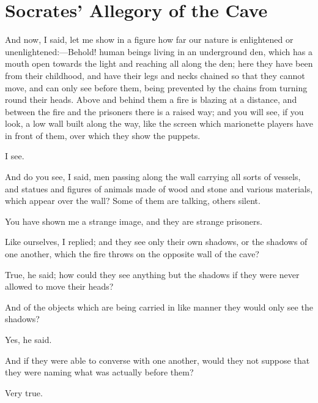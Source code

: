 
\author{Plato}
\chapter[Socrates' Allegory of the Cave]{Socrates' Allegory of the Cave}


And now, I said, let me show in a figure how far our nature is
enlightened or un\-en\-light\-ened:---Behold! human beings living in
an underground den, which has a mouth open towards the light and
reaching all along the den; here they have been from their childhood,
and have their legs and necks chained so that they cannot move, and
can only see before them, being prevented by the chains from turning
round their heads. Above and behind them a fire is blazing at a
distance, and between the fire and the prisoners there is a raised
way; and you will see, if you look, a low wall built along the way,
like the screen which marionette players have in front of them, over
which they show the puppets.

I see.

And do you see, I said, men passing along the wall carrying all sorts
of vessels, and statues and figures of animals made of wood and stone
and various materials, which appear over the wall? Some of them are
talking, others silent.

You have shown me a strange image, and they are strange prisoners.

Like ourselves, I replied; and they see only their own shadows, or the
shadows of one another, which the fire throws on the opposite wall of
the cave?

True, he said; how could they see anything but the shadows if they
were never allowed to move their heads?

And of the objects which are being carried in like manner they would
only see the shadows?

Yes, he said.

And if they were able to converse with one another, would they not
suppose that they were naming what was actually before them?

Very true.

